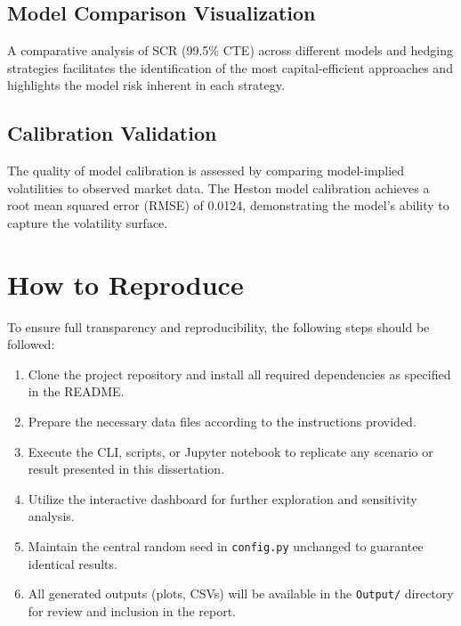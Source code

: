 \documentclass[12pt,a4paper]{report}
\begin{document}
\subsection{Model Comparison Visualization}
A comparative analysis of SCR (99.5\% CTE) across different models and hedging strategies facilitates the identification of the most capital-efficient approaches and highlights the model risk inherent in each strategy.

\subsection{Calibration Validation}
The quality of model calibration is assessed by comparing model-implied volatilities to observed market data. The Heston model calibration achieves a root mean squared error (RMSE) of 0.0124, demonstrating the model's ability to capture the volatility surface.

\section*{How to Reproduce}
To ensure full transparency and reproducibility, the following steps should be followed:
\begin{enumerate}
    \item Clone the project repository and install all required dependencies as specified in the README.
    \item Prepare the necessary data files according to the instructions provided.
    \item Execute the CLI, scripts, or Jupyter notebook to replicate any scenario or result presented in this dissertation.
    \item Utilize the interactive dashboard for further exploration and sensitivity analysis.
    \item Maintain the central random seed in \texttt{config.py} unchanged to guarantee identical results.
    \item All generated outputs (plots, CSVs) will be available in the \texttt{Output/} directory for review and inclusion in the report.
\end{enumerate}
\end{document}
